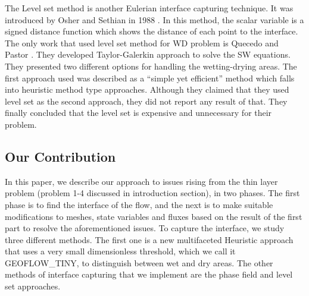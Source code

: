 \documentclass[letterpaper,10pt]{article}
\begin{document}
The Level set method is another Eulerian interface capturing technique. It was introduced by Osher and Sethian in 1988 \cite{Osher1988}. In this method, the scalar variable is a signed distance function which shows the distance of each point to the interface. 
The only work that used level set method for WD problem is Quecedo and Pastor \cite{quecedo2002rtg}. They developed Taylor-Galerkin approach to solve the SW equations. They presented two different options for handling the wetting-drying areas. The first approach used was described as a ``simple yet efficient'' method which falls into heuristic method type approaches. Although they claimed that they used level set as the second approach, they did not report any result of that.
They finally concluded that the level set is expensive and unnecessary for their problem.\newline



\subsection{Our Contribution}
In this paper, we describe our approach to issues rising from the thin layer problem (problem 1-4 discussed in introduction section), in  two phases. The first phase is to find the interface of the flow, and the next  is to make suitable modifications to meshes, state variables and fluxes based on the result of the first part to resolve the aforementioned issues.
To capture the interface, we study three different methods. The first one is a new multifaceted Heuristic approach that uses a very small dimensionless threshold, which we call it GEOFLOW\_TINY, to distinguish between wet and dry areas. The other methods of interface capturing that we implement are the phase field and  level set approaches.
\end{document}
